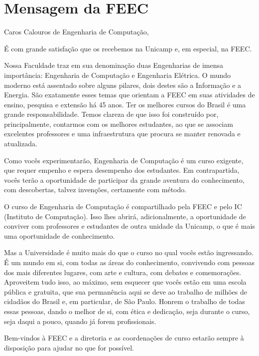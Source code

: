 
\section{Mensagem da FEEC}


Caros Calouros de Engenharia de Computação,

É com grande satisfação que os recebemos na Unicamp e, em especial, na FEEC.

Nossa Faculdade traz em sua denominação duas Engenharias de imensa importância:
Engenharia de Computação e Engenharia Elétrica.  O mundo moderno está assentado
sobre alguns pilares, dois destes são a Informação e a Energia.  São exatamente
esses temas que orientam a FEEC em suas atividades de ensino, pesquisa e
extensão há 45 anos. Ter os melhores cursos do Brasil é uma grande
responsabilidade. Temos clareza de que isso foi construído por, principalmente,
contarmos com os melhores estudantes, ao que se associam excelentes professores
e uma infraestrutura que procura se manter renovada e atualizada.

Como vocês experimentarão, Engenharia de Computação é um curso exigente, que
requer empenho e espera desempenho dos estudantes. Em contrapartida, vocês terão
a oportunidade de participar da grande aventura do conhecimento, com
descobertas, talvez invenções, certamente com método.

O curso de Engenharia de Computação é compartilhado pela FEEC e pelo IC
(Instituto de Computação). Isso lhes abrirá, adicionalmente, a oportunidade de
conviver com professores e estudantes de outra unidade da Unicamp, o que é mais
uma oportunidade de conhecimento.

Mas a Universidade é muito mais do que o curso no qual vocês estão ingressando.
É um mundo em si, com todas as áreas do conhecimento, convivendo com pessoas dos
mais diferentes lugares, com arte e cultura, com debates e comemorações.
Aproveitem tudo isso, ao máximo, sem esquecer que vocês estão em uma escola
pública e gratuita, que sua permanência aqui se deve ao trabalho de milhões de
cidadãos do Brasil e, em particular, de São Paulo. Honrem o trabalho de todas
essas pessoas, dando o melhor de si, com ética e dedicação, seja durante o
curso, seja daqui a pouco, quando já forem profissionais.

Bem-vindos à FEEC e a diretoria e as coordenações de curso estarão sempre à
disposição para ajudar no que for possível.

